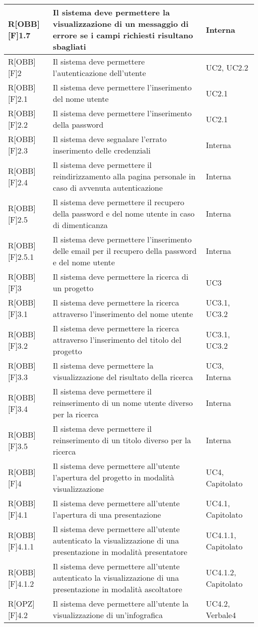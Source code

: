 \begin{table}[h]
		\begin{tabular}{|p{}|p{}|p{}|}
		\midrule

R[OBB][F]1.7 & Il sistema deve permettere la visualizzazione di un messaggio di errore se i campi richiesti risultano sbagliati & Interna \\ \midrule
R[OBB][F]2 & Il sistema deve permettere l'autenticazione dell'utente & UC2, UC2.2 \\ \midrule
R[OBB][F]2.1 & Il sistema deve permettere l'inserimento del nome utente & UC2.1 \\ \midrule
R[OBB][F]2.2 & Il sistema deve permettere l'inserimento della password & UC2.1 \\ \midrule
R[OBB][F]2.3 & Il sistema deve segnalare l'errato inserimento delle credenziali & Interna \\ \midrule
R[OBB][F]2.4 & Il sistema deve permettere il reindirizzamento alla pagina personale in caso di avvenuta autenticazione & Interna \\ \midrule
R[OBB][F]2.5 & Il sistema deve permettere il recupero della password e del nome utente in caso di dimenticanza & Interna \\ \midrule
R[OBB][F]2.5.1 & Il sistema deve permettere l'inserimento delle email per il recupero della password e del nome utente & Interna \\ \midrule
R[OBB][F]3 & Il sistema deve permettere la ricerca di un progetto  & UC3 \\ \midrule
R[OBB][F]3.1 & Il sistema deve permettere la ricerca attraverso l'inserimento del nome utente & UC3.1, UC3.2 \\ \midrule
R[OBB][F]3.2 & Il sistema deve permettere la ricerca attraverso l'inserimento del titolo del progetto & UC3.1, UC3.2 \\ \midrule
R[OBB][F]3.3 & Il sistema deve permettere la visualizzazione del risultato della ricerca & UC3, Interna \\ \midrule
R[OBB][F]3.4 & Il sistema deve permettere il reinserimento di un nome utente diverso per la ricerca & Interna \\ \midrule
R[OBB][F]3.5 & Il sistema deve permettere il reinserimento di un titolo diverso per la ricerca & Interna \\ \midrule
R[OBB][F]4 & Il sistema deve permettere all'utente l'apertura del progetto in modalità visualizzazione & UC4, Capitolato \\ \midrule
R[OBB][F]4.1 & Il sistema deve permettere all'utente l'apertura di una presentazione & UC4.1, Capitolato \\ \midrule
R[OBB][F]4.1.1 & Il sistema deve permettere all'utente autenticato la visualizzazione di una presentazione in modalità presentatore & UC4.1.1, Capitolato \\ \midrule
R[OBB][F]4.1.2 & Il sistema deve permettere all'utente autenticato la visualizzazione di una presentazione in modalità ascoltatore & UC4.1.2, Capitolato \\ \midrule
R[OPZ][F]4.2 & Il sistema deve permettere all'utente la visualizzazione di un'\gls{infografica} & UC4.2, Verbale4 \\ \midrule


\end{tabular}
\end{table}
